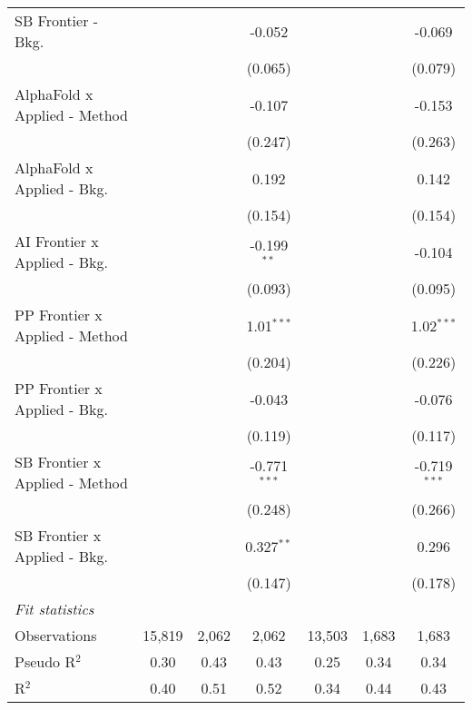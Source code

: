 \begin{tabular}{lcccccc}
   SB Frontier - Bkg.             &         &             & -0.052         &              &         & -0.069\\   
                                  &         &             & (0.065)        &              &         & (0.079)\\   
   AlphaFold x Applied - Method   &         &             & -0.107         &              &         & -0.153\\   
                                  &         &             & (0.247)        &              &         & (0.263)\\   
   AlphaFold x Applied - Bkg.     &         &             & 0.192          &              &         & 0.142\\   
                                  &         &             & (0.154)        &              &         & (0.154)\\   
   AI Frontier x Applied - Bkg.   &         &             & -0.199$^{**}$  &              &         & -0.104\\   
                                  &         &             & (0.093)        &              &         & (0.095)\\   
   PP Frontier x Applied - Method &         &             & 1.01$^{***}$   &              &         & 1.02$^{***}$\\   
                                  &         &             & (0.204)        &              &         & (0.226)\\   
   PP Frontier x Applied - Bkg.   &         &             & -0.043         &              &         & -0.076\\   
                                  &         &             & (0.119)        &              &         & (0.117)\\   
   SB Frontier x Applied - Method &         &             & -0.771$^{***}$ &              &         & -0.719$^{***}$\\   
                                  &         &             & (0.248)        &              &         & (0.266)\\   
   SB Frontier x Applied - Bkg.   &         &             & 0.327$^{**}$   &              &         & 0.296\\   
                                  &         &             & (0.147)        &              &         & (0.178)\\   
   \midrule
   \emph{Fit statistics}\\
   Observations                   & 15,819  & 2,062       & 2,062          & 13,503       & 1,683   & 1,683\\  
   Pseudo R$^2$                   & 0.30    & 0.43        & 0.43           & 0.25         & 0.34    & 0.34\\  
   R$^2$                          & 0.40    & 0.51        & 0.52           & 0.34         & 0.44    & 0.43\\  
   

\end{tabular}
